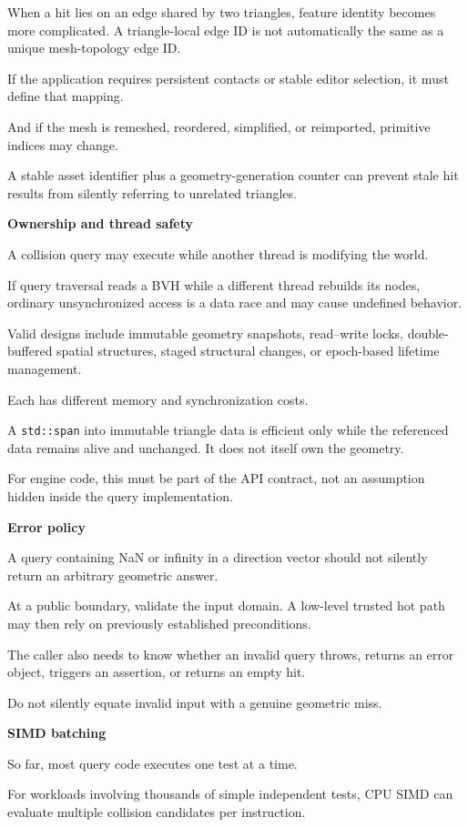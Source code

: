 When a hit lies on an edge shared by two triangles, feature identity becomes more complicated. A triangle-local edge ID is not automatically the same as a unique mesh-topology edge ID.

If the application requires persistent contacts or stable editor selection, it must define that mapping.

And if the mesh is remeshed, reordered, simplified, or reimported, primitive indices may change.

A stable asset identifier plus a geometry-generation counter can prevent stale hit results from silently referring to unrelated triangles.

\textbf{Ownership and thread safety}

A collision query may execute while another thread is modifying the world.

If query traversal reads a BVH while a different thread rebuilds its nodes, ordinary unsynchronized access is a data race and may cause undefined behavior.

Valid designs include immutable geometry snapshots, read--write locks, double-buffered spatial structures, staged structural changes, or epoch-based lifetime management.

Each has different memory and synchronization costs.

A \texttt{std::span} into immutable triangle data is efficient only while the referenced data remains alive and unchanged. It does not itself own the geometry.

For engine code, this must be part of the API contract, not an assumption hidden inside the query implementation.

\textbf{Error policy}

A query containing NaN or infinity in a direction vector should not silently return an arbitrary geometric answer.

At a public boundary, validate the input domain. A low-level trusted hot path may then rely on previously established preconditions.

The caller also needs to know whether an invalid query throws, returns an error object, triggers an assertion, or returns an empty hit.

Do not silently equate invalid input with a genuine geometric miss.

\textbf{SIMD batching}

So far, most query code executes one test at a time.

For workloads involving thousands of simple independent tests, CPU SIMD can evaluate multiple collision candidates per instruction.

